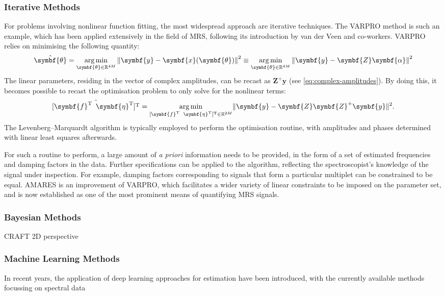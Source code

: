\subsubsection{Iterative Methods}
For problems involving nonlinear function fitting, the most widespread approach
are iterative techniques. The \ac{VARPRO} method\cite{Golub1973} is such an
example, which has been applied extensively in the field of \ac{MRS}, following
its introduction by van der Veen and
co-workers\cite{VanDerVeen1988,Decannierec1994}. \ac{VARPRO}
relies on minimising the following quantity:
\begin{equation}
    \hat{\symbf{\theta}} = \argmin_{\symbf{\theta} \in \mathbb{R}^{4M}}
        \left \lVert \symbf{y} - \symbf{x}(\symbf{\theta}) \right \rVert^2 \equiv
        \argmin_{\symbf{\theta} \in \mathbb{R}^{4M}} \left \lVert \symbf{y} - \symbf{Z}\symbf{\alpha} \right \rVert^2
\end{equation}
The linear parameters, residing in the vector of complex amplitudes, can be
recast as $\symbf{Z}^+\symbf{y}$ (see \cref{eq:complex-amplitudes}). By doing
this, it becomes possible to recast the optimisation problem to only solve for
the nonlinear terms:
\begin{equation}
    \hat{[\symbf{f}\T \hspace*{5pt} \symbf{\eta}\T]\T} =
        \argmin_{[\symbf{f}\T \hspace*{5pt} \symbf{\eta}\T]\T \in \mathbb{R}^{2M}}
        \lVert \symbf{y} - \symbf{Z}\symbf{Z}^+\symbf{y} \rVert^2.
\end{equation}
The Levenberg–Marquardt algorithm\cite{Levenberg1944, Marquardt1963} is
typically employed to perform the optimisation routine, with amplitudes and
phases determined with linear least squares afterwards.

For such a routine to perform, a large amount of \textit{a priori} information
needs to be provided, in the form of a set of estimated frequencies and damping
factors in the data. Further specifications can be applied to the algorithm,
reflecting the spectroscopist's knowledge of the signal under
inspection. For example, damping factors corresponding to signals that form a
particular multiplet can be constrained to be equal.
\Ac{AMARES} is an improvement of \ac{VARPRO}, which facilitates a wider variety
of linear constraints to be imposed on the parameter set\cite{Vanhamme1997},
and is now established as one of the most prominent means of quantifying
\ac{MRS} signals.

\subsubsection{Bayesian Methods}
\ac{CRAFT}\cite{Krishnamurthy2013}
2D\cite{Krishnamurthy2017}
perspective\cite{Krishnamurthy2021}

\subsubsection{Machine Learning Methods}
In recent years, the application of deep learning approaches for estimation have been
introduced, with the currently available methods focussing on spectral
data\cite{Li2021,Schmid2023}
